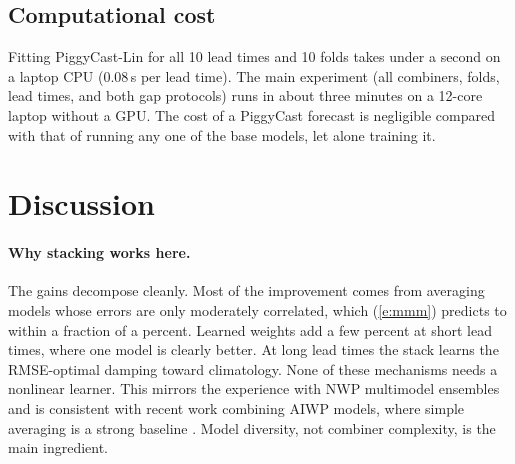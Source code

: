 \documentclass[twocol]{ametsocV6.1}
\newcommand{\PCLin}{PiggyCast-Lin}
\begin{document}
\subsection{Computational cost}

Fitting \PCLin{} for all 10 lead times and 10 folds takes under a second on a laptop CPU (0.08\,s per lead time). The main experiment (all combiners, folds, lead times, and both gap protocols) runs in about three minutes on a 12-core laptop without a GPU. The cost of a PiggyCast forecast is negligible compared with that of running any one of the base models, let alone training it.

\section{Discussion}

\paragraph{Why stacking works here.} The gains decompose cleanly. Most of the improvement comes from averaging models whose errors are only moderately correlated, which (\ref{e:mmm}) predicts to within a fraction of a percent. Learned weights add a few percent at short lead times, where one model is clearly better. At long lead times the stack learns the RMSE-optimal damping toward climatology. None of these mechanisms needs a nonlinear learner. This mirrors the experience with NWP multimodel ensembles \citep{krishnamurti1999superensemble, hagedorn2005multimodel} and is consistent with recent work combining AIWP models, where simple averaging is a strong baseline \citep{chakraborty2025mowe, weyn2024ensemble}. Model diversity, not combiner complexity, is the main ingredient.
\end{document}
